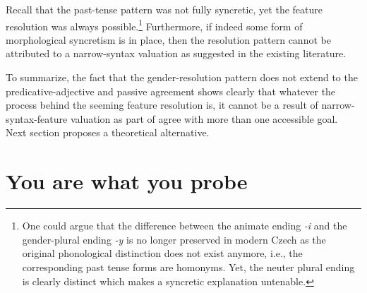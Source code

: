 \documentclass[output=paper,
modfonts
newtxmath,
hidelinks
]{langscibook}
\begin{document}
\ea\label{gaps}
\smallskip
{}
\z\z

\noindent Recall that the past-tense pattern was not fully syncretic, yet the feature resolution was always possible.\footnote{One could argue that the difference between the animate ending \textit{-i} and the gender-plural ending \textit{-y} is no longer preserved in modern Czech as the original phonological distinction does not exist anymore, i.e., the corresponding past tense forms are homonyms. Yet, the neuter plural ending is clearly distinct which makes a syncretic explanation untenable.}
 Furthermore, if indeed some form of morphological syncretism is in place, then the resolution pattern cannot be attributed to a narrow-syntax valuation as suggested in the existing literature. 
 
To summarize, the fact that the gender-resolution pattern does not extend to the predicative-adjective and passive agreement shows clearly that whatever the process behind the seeming feature resolution is, it cannot be a result of narrow-syntax-feature valuation as part of agree with more than one accessible goal. Next section proposes a theoretical alternative.


\section{You are what you probe}
\end{document}
